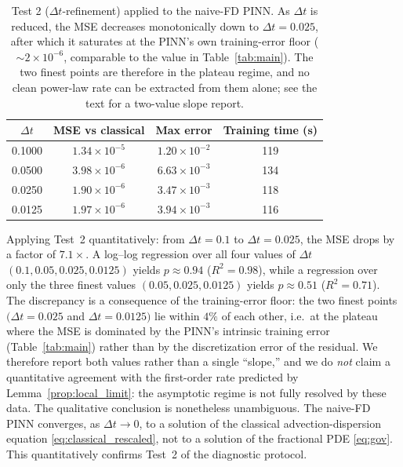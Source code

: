 \documentclass[11pt]{article}
\begin{document}
\begin{table}[h]
\centering
\caption{Test 2 (\(\Delta t\)-refinement) applied to the naive-FD PINN.
         As \(\Delta t\) is reduced, the MSE decreases monotonically
         down to \(\Delta t = 0.025\), after which it saturates at
         the PINN's own training-error floor
         (\({\sim}2\times 10^{-6}\), comparable to the value in
         Table~\ref{tab:main}). The two finest points are therefore
         in the plateau regime, and no clean power-law rate can be
         extracted from them alone; see the text for a two-value
         slope report.}
\label{tab:dt_refinement}
\begin{tabular}{cccc}
\toprule
\(\Delta t\) & MSE vs classical & Max error & Training time (s) \\
\midrule
0.1000 & \(1.34\times 10^{-5}\) & \(1.20\times 10^{-2}\) & 119 \\
0.0500 & \(3.98\times 10^{-6}\) & \(6.63\times 10^{-3}\) & 134 \\
0.0250 & \(1.90\times 10^{-6}\) & \(3.47\times 10^{-3}\) & 118 \\
0.0125 & \(1.97\times 10^{-6}\) & \(3.94\times 10^{-3}\) & 116 \\
\bottomrule
\end{tabular}
\end{table}

Applying Test~2 quantitatively: from \(\Delta t = 0.1\) to
\(\Delta t = 0.025\), the MSE drops by a factor of \(7.1\times\).
A log--log regression over all four values of \(\Delta t\)
\((0.1, 0.05, 0.025, 0.0125)\) yields \(p \approx 0.94\)
(\(R^2 = 0.98\)), while a regression over only the three finest
values \((0.05, 0.025, 0.0125)\) yields \(p \approx 0.51\)
(\(R^2 = 0.71\)). The discrepancy is a consequence of the
training-error floor: the two finest points
\((\Delta t = 0.025\) and \(\Delta t = 0.0125)\) lie within \(4\%\)
of each other, i.e.\ at the plateau where the MSE is dominated by
the PINN's intrinsic training error (Table~\ref{tab:main}) rather
than by the discretization error of the residual. We therefore
report both values rather than a single ``slope,'' and we do
\emph{not} claim a quantitative agreement with the first-order
rate predicted by Lemma~\ref{prop:local_limit}: the asymptotic
regime is not fully resolved by these data. The qualitative
conclusion is nonetheless unambiguous. The naive-FD PINN
converges, as \(\Delta t \to 0\), to a solution of the classical
advection-dispersion equation \eqref{eq:classical_rescaled}, not
to a solution of the fractional PDE \eqref{eq:gov}. This
quantitatively confirms Test~2 of the diagnostic protocol.
\end{document}
